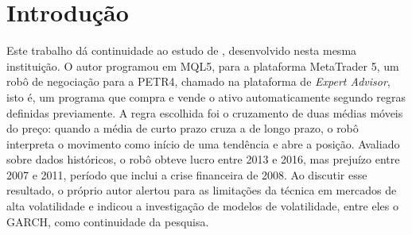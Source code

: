 %
%
%
\chapter*{Introdução}
{}

Este trabalho dá continuidade ao estudo de , desenvolvido
nesta mesma instituição. O autor programou em MQL5, para a plataforma MetaTrader 5,
um robô de negociação para a PETR4, chamado na plataforma de \textit{Expert
Advisor}, isto é, um programa que compra e vende o ativo automaticamente segundo
regras definidas previamente. A regra escolhida foi
o cruzamento de duas médias móveis do preço: quando a média de curto prazo cruza a
de longo prazo, o robô interpreta o movimento como início de uma tendência e abre a
posição. Avaliado sobre dados históricos, o robô obteve lucro entre 2013 e 2016,
mas prejuízo entre 2007 e 2011, período que inclui a crise financeira de 2008. Ao
discutir esse resultado, o próprio autor alertou para as limitações da técnica em
mercados de alta volatilidade e indicou a investigação de modelos de volatilidade,
entre eles o GARCH, como continuidade da pesquisa.

